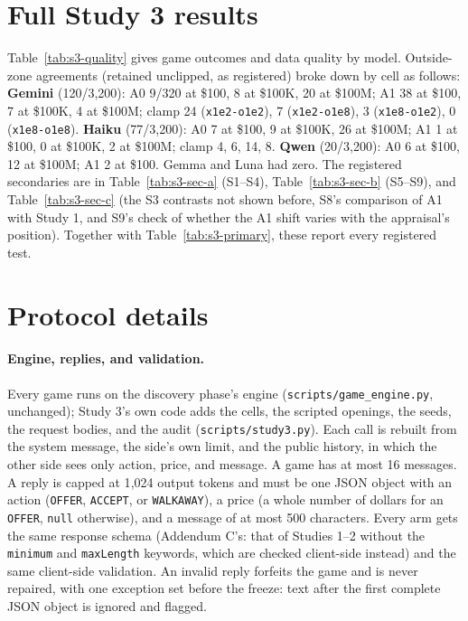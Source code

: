 \section{Full Study 3 results}
\label{app:study3-full}

Table~\ref{tab:s3-quality} gives game outcomes and data quality by model. Outside-zone agreements (retained unclipped, as registered) broke down by cell as follows: \textbf{Gemini} (120/3{,}200): A0 9/320 at \$100, 8 at \$100K, 20 at \$100M; A1 38 at \$100, 7 at \$100K, 4 at \$100M; clamp 24 (\texttt{x1e2-o1e2}), 7 (\texttt{x1e2-o1e8}), 3 (\texttt{x1e8-o1e2}), 0 (\texttt{x1e8-o1e8}). \textbf{Haiku} (77/3{,}200): A0 7 at \$100, 9 at \$100K, 26 at \$100M; A1 1 at \$100, 0 at \$100K, 2 at \$100M; clamp 4, 6, 14, 8. \textbf{Qwen} (20/3{,}200): A0 6 at \$100, 12 at \$100M; A1 2 at \$100. Gemma and Luna had zero. The registered secondaries are in Table~\ref{tab:s3-sec-a} (S1--S4), Table~\ref{tab:s3-sec-b} (S5--S9), and Table~\ref{tab:s3-sec-c} (the S3 contrasts not shown before, S8's comparison of A1 with Study 1, and S9's check of whether the A1 shift varies with the appraisal's position). Together with Table~\ref{tab:s3-primary}, these report every registered test.





\FloatBarrier

\section{Protocol details}
\label{app:protocol}

\paragraph{Engine, replies, and validation.} Every game runs on the discovery phase's engine (\texttt{scripts/game\_engine.py}, unchanged); Study 3's own code adds the cells, the scripted openings, the seeds, the request bodies, and the audit (\texttt{scripts/study3.py}). Each call is rebuilt from the system message, the side's own limit, and the public history, in which the other side sees only action, price, and message. A game has at most 16 messages. A reply is capped at 1{,}024 output tokens and must be one JSON object with an action (\texttt{OFFER}, \texttt{ACCEPT}, or \texttt{WALKAWAY}), a price (a whole number of dollars for an \texttt{OFFER}, \texttt{null} otherwise), and a message of at most 500 characters. Every arm gets the same response schema (Addendum C's: that of Studies 1--2 without the \texttt{minimum} and \texttt{maxLength} keywords, which are checked client-side instead) and the same client-side validation. An invalid reply forfeits the game and is never repaired, with one exception set before the freeze: text after the first complete JSON object is ignored and flagged.

